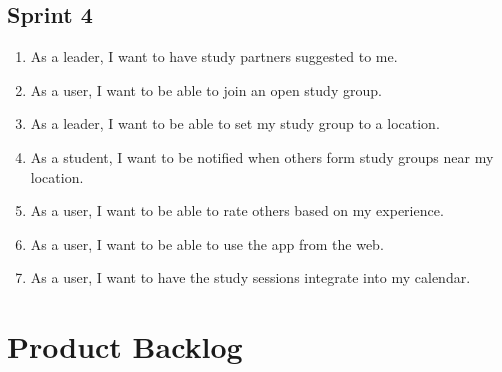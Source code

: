 \documentclass[10pt]{article}
\begin{document}
    \subsection{Sprint 4}
    \begin{enumerate}
        \item As a leader, I want to have study partners suggested to me.
        \item As a user, I want to be able to join an open study group.
        \item As a leader, I want to be able to set my study group to a location.
        \item As a student, I want to be notified when others form study groups near my location.
        \item As a user, I want to be able to rate others based on my experience.
        \item As a user, I want to be able to use the app from the web.
        \item As a user, I want to have the study sessions integrate into my calendar.
    \end{enumerate}

    \section{Product Backlog}
    
    
\end{document}

